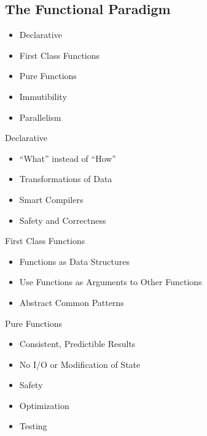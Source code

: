 \documentclass{beamer}                  %
\newcommand{\srule}{
	\rule{\textwidth}{1pt}\\
}
\newlength{\subsecwidth}
\newenvironment{slide}{
	\begin{frame} %
	\settowidth{\subsecwidth}{\insertsubsection} %
	\ifthenelse{\dimtest{\subsecwidth}{<}{1pt}}{ %
		\frametitle{\insertsection\\             %
		\vspace{-1ex}                            %
		\color{fore}\srule                       %
		\par                                     %
		\vspace{-3ex}                            %
		}
	}{                                           %
		\frametitle{\insertsection\ -- \insertsubsection\\ %
		\vspace{-1ex}                            %
		\color{fore}\srule                       %
		\par                                     %
		\vspace{-3ex}                            %
		}
	}
	\Large                                       %
}{
	\end{frame}
}
\begin{document}
\subsection{The Functional Paradigm}

\begin{slide}
  \begin{itemize}
    \item Declarative
    \item First Class Functions
    \item Pure Functions
    \item Immutibility
    \item Parallelism
  \end{itemize}
\end{slide}

\begin{slide}
  Declarative
  \begin{itemize}
    \item ``What'' instead of ``How''
    \item Transformations of Data
    \item Smart Compilers
    \item Safety and Correctness
  \end{itemize}
\end{slide}

\begin{slide}
  First Class Functions
  \begin{itemize}
    \item Functions as Data Structures
    \item Use Functions as Arguments to Other Functions
    \item Abstract Common Patterns
  \end{itemize}
\end{slide}

\begin{slide}
  Pure Functions
  \begin{itemize}
    \item Consistent, Predictible Results
    \item No I/O or Modification of State
    \item Safety
    \item Optimization
    \item Testing
  \end{itemize}
\end{slide}
\end{document}
